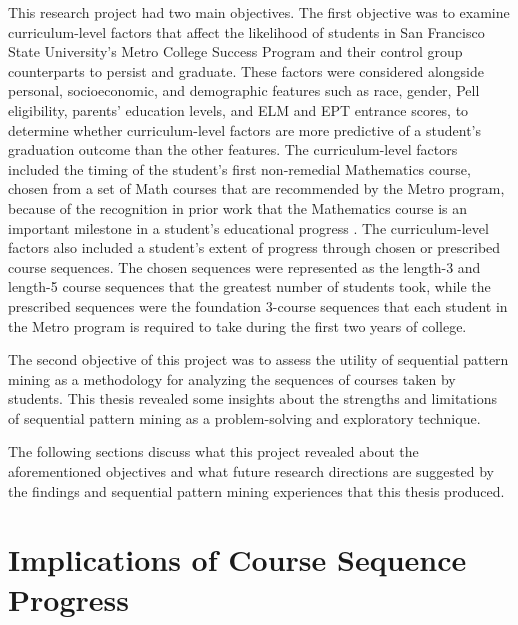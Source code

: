 This research project had two main objectives.  The first objective was to examine curriculum-level factors that affect the likelihood of students in San Francisco State University's Metro College Success Program and their control group counterparts to persist and graduate.  These factors were considered alongside personal, socioeconomic, and demographic features such as race, gender, Pell eligibility, parents' education levels, and ELM and EPT entrance scores, to determine whether curriculum-level factors are more predictive of a student's  graduation outcome than the other features.  The curriculum-level factors included the timing of the student's first non-remedial Mathematics course, chosen from a set of Math courses that are recommended by the Metro program, because of the recognition in prior work that the Mathematics course is an important milestone in a student's educational progress \cite{Bhaskaran}.    The curriculum-level factors also included a student's extent of progress through chosen or prescribed course sequences.  The chosen sequences were represented as the length-3 and length-5 course sequences that the greatest number of students took, while the prescribed sequences were the foundation 3-course sequences that each student in the Metro program is required to take during the first two years of college.  

The second objective of this project was to assess the utility of sequential pattern mining as a methodology for analyzing the sequences of courses taken by students.  This thesis revealed some insights about the strengths and limitations of sequential pattern mining as a problem-solving and exploratory technique.

The following sections discuss what this project revealed about the aforementioned objectives and what future research directions are suggested by the findings and sequential pattern mining experiences that this thesis produced.     

\section{Implications of Course Sequence Progress}

